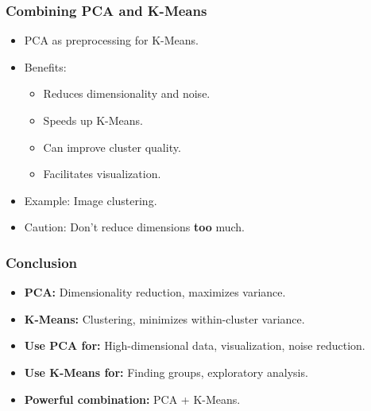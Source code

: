 \documentclass[aspectratio=169]{beamer}
\begin{document}
\begin{frame}
\frametitle{Combining PCA and K-Means}
\begin{itemize}
    \item PCA as preprocessing for K-Means.
    \item Benefits:
    \begin{itemize}
        \item Reduces dimensionality and noise.
        \item Speeds up K-Means.
        \item Can improve cluster quality.
        \item Facilitates visualization.
    \end{itemize}
    \item Example: Image clustering.
    \item Caution: Don't reduce dimensions \textbf{too} much.
\end{itemize}
\end{frame}



\begin{frame}
\frametitle{Conclusion}
\begin{itemize}
    \item \textbf{PCA:} Dimensionality reduction, maximizes variance.
    \item \textbf{K-Means:} Clustering, minimizes within-cluster variance.
    \item \textbf{Use PCA for:} High-dimensional data, visualization, noise reduction.
    \item \textbf{Use K-Means for:}  Finding groups, exploratory analysis.
    \item \textbf{Powerful combination:} PCA + K-Means.
\end{itemize}
\end{frame}
\end{document}

